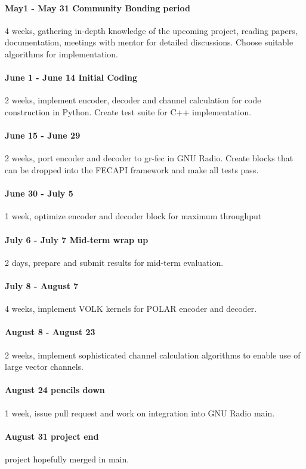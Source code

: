 \documentclass[a4paper,12pt]{scrartcl}
\begin{document}
\paragraph{May1 - May 31 Community Bonding period} 4 weeks, gathering in-depth knowledge of the upcoming project, reading papers, documentation, meetings with mentor for detailed discussions.
Choose suitable algorithms for implementation.
\paragraph{June 1 - June 14 Initial Coding} 2 weeks, implement encoder, decoder and channel calculation for code construction in Python.
Create test suite for C++ implementation.
\paragraph{June 15 - June 29} 2 weeks, port encoder and decoder to gr-fec in GNU Radio.
Create blocks that can be dropped into the FECAPI framework and make all tests pass.
\paragraph{June 30 - July 5} 1 week, optimize encoder and decoder block for maximum throughput
\paragraph{July 6 - July 7 Mid-term wrap up} 2 days, prepare and submit results for mid-term evaluation.
\paragraph{July 8 - August 7} 4 weeks, implement VOLK kernels for POLAR encoder and decoder.
\paragraph{August 8 - August 23} 2 weeks, implement sophisticated channel calculation algorithms to enable use of large vector channels.
\paragraph{August 24 pencils down} 1 week, issue pull request and work on integration into GNU Radio main.
\paragraph{August 31 project end} project hopefully merged in main.
\end{document}
